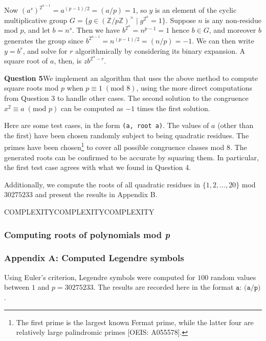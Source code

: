 \documentclass[12pt]{article}
\newcommand{\textmod}[1]{\;(\text{mod }#1)}
\begin{document}
Now \((a^s)^{2^{\alpha - 1}} = a^{(p-1)/2} = (a/p)= 1\), so \(y\) is an  element of the
cyclic multiplicative group \(G=\{g\in
(\mathbb{Z}/p\mathbb{Z})^\times\;|\;g^{2^{\alpha}} = 1\}\). Suppose \(n\) is any
non-residue mod \(p\), and let \(b=n^s\). Then we have \(b^{2^\alpha}=n^{p-1} =
1\) hence \(b\in G\), and moreover \(b\) generates the group since
\(b^{2^{\alpha - 1}}=n^{(p-1)/2} = (n/p)=-1\). We can then write \(y = b^r\),
and solve for \(r\) algorithmically by considering its binary expansion. A
square root of \(a\), then, is \(zb^{2^{\alpha}-r}\).

\textbf{Question 5}\quad We implement an algorithm that uses the above method to
compute square roots mod \(p\) when \(p\equiv 1 \textmod{8}\), using the more
direct computations from Question 3 to handle other cases. The second solution
to the congruence \(x^2\equiv a \textmod{p}\) can be computed as \(-1\) times the first
solution. 

Here are some test cases, in the form \texttt{(a, root a)}. The values of \(a\)
(other than the first) have been chosen randomly subject to being quadratic
residues. The primes have been chosen\footnote{The first prime is the largest
known Fermat prime, while the latter four are relatively large palindromic
primes [OEIS: A055578].} to cover all possible congruence classes mod \(8\). The
generated roots can be confirmed to be accurate by squaring them. In particular,
the first test case agrees with what we found in Question 4.



Additionally, we compute the roots of all quadratic residues in
\(\{1,2,...,20\}\) mod \(30275233\) and present the results in Appendix B.

COMPLEXITYCOMPLEXITYCOMPLEXITY

\subsubsection{Computing roots of polynomials mod \textit{p}}

\subsubsection*{Appendix A: Computed Legendre symbols}
Using Euler's criterion, Legendre symbols were computed for \(100\) random
values between \(1\) and \(p=30275233\). The results are recorded here in the
format \(\texttt{a: (a/p)}\).

 
\end{document}
